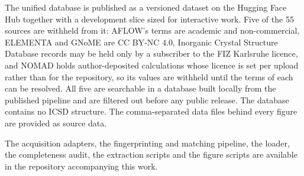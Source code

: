 \documentclass[pdflatex,sn-nature]{sn-jnl}%
\begin{document}
The unified database is published as a versioned dataset on the Hugging Face Hub
together with a development slice sized for interactive work. Five of the 55
sources are withheld from it: AFLOW's terms are academic and non-commercial,
ELEMENTA and GNoME are CC BY-NC 4.0, Inorganic Crystal Structure Database records
may be held only by a subscriber to the FIZ Karlsruhe licence, and NOMAD holds
author-deposited calculations whose licence is set per upload rather than for the
repository, so its values are withheld until the terms of each can be resolved.
All five are searchable in a database built locally from the published pipeline
and are filtered out before any public release. The database
contains no ICSD structure. The comma-separated data files behind every figure
are provided as source data.

The acquisition adapters, the fingerprinting and matching pipeline, the loader,
the completeness audit, the extraction scripts and the figure scripts are
available in the repository accompanying this work.

\begingroup
\linespread{1.60}\selectfont

\endgroup
\end{document}
